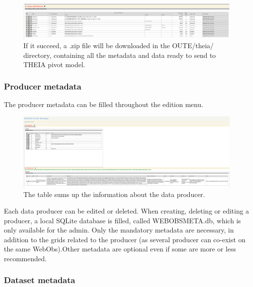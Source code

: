 \begin{figure}[!h]
	\centering
	\includegraphics[scale=0.25]{figures/sendTHEIA.png}
	\caption{If it succeed, a .zip file will be downloaded in the OUTE/theia/ directory, containing all the metadata and data ready to send to THEIA pivot model.}
	\label{sendTHEIA}
\end{figure}

\newpage

\subsubsection{Producer metadata}

The producer metadata can be filled throughout the  edition menu. 

\begin{figure}[!h]
	\centering
	\includegraphics[width=\textwidth]{figures/gridsMgr.png}
	\caption{The table sums up the information about the data producer.}
	\label{girdsMgr}
\end{figure}

Each data producer can be edited or deleted. When creating, deleting or editing a producer, a local SQLite database is filled,  called WEBOBSMETA.db, which is only available for the admin. Only the mandatory metadata are necessary, in addition to the grids related to the producer (as several producer can co-exist on the same WebObs).Other metadata are optional even if some are more or less recommended.

\newpage

\subsubsection{Dataset metadata}

